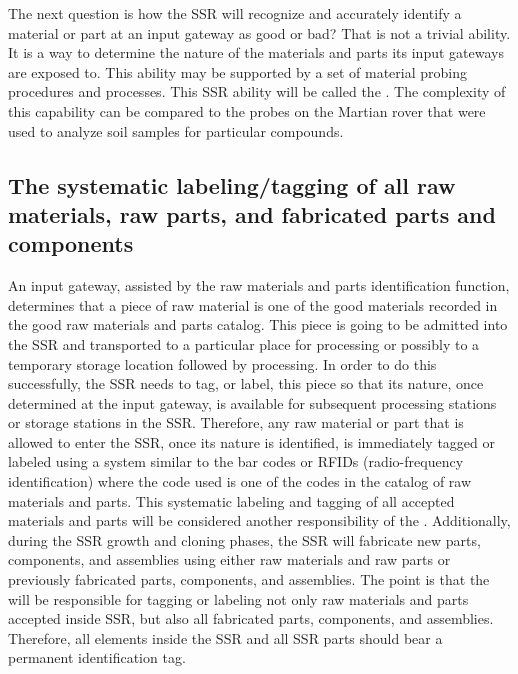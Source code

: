 The next question is how the SSR
will recognize and accurately identify a material or part at an input
gateway as good or bad? That is not a trivial ability. 
It is a way to
determine the nature of the materials and parts its input gateways are
exposed to. This ability may be supported by a set of material probing
procedures and processes. This SSR ability will be called the
. 
The complexity of this capability can be compared to the probes on the Martian rover that were used to analyze soil samples for particular compounds.

\subsection[The systematic labeling/tagging of all raw materials, raw parts, and fabricated parts and components]{The systematic labeling/tagging of all raw materials, raw parts, and fabricated parts
and components}

An input gateway,
assisted by the raw materials and parts identification function,
determines that a piece of raw material is one of the good materials
recorded in the good raw materials and parts catalog. This piece is
going to be admitted into the SSR and transported to a particular place
for processing or possibly to a temporary storage location followed by
processing.  In order to do this successfully, the SSR needs
to tag, or label, this piece so that its nature, once
determined at the input gateway, is available for
subsequent processing stations or storage stations in the SSR. Therefore,
any raw material or part that is allowed to enter the SSR, once
its nature is identified, is immediately tagged or labeled using a system
similar to the bar codes or RFIDs (radio-frequency identification)
where the code used is one of the codes in the catalog of raw materials
and parts. This systematic labeling and tagging of all accepted
materials and parts will be considered another responsibility of the
.  Additionally,
during the SSR growth and cloning phases, the SSR will fabricate new parts, components, and assemblies
using either raw materials and raw parts or previously fabricated
parts, components, and assemblies. The point is that the 
will be responsible for tagging or labeling not
only raw materials and parts accepted inside SSR, but also all
fabricated parts, components, and assemblies. Therefore,
all elements inside the SSR and all SSR parts should bear
a permanent identification tag.

